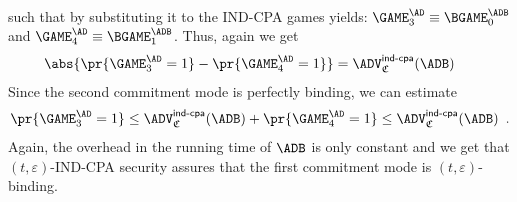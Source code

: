 \documentclass{crypto-exercise}
\newcommand{\ADVINDCPA}[2]{\ADV^{\mathsf{ind\text{-}cpa}}_{#1}{(#2)}}
\newcommand{\CS}{\mathfrak{C}}
\theoremstyle{plain}\newtheorem{stmt}{Statement}
\begin{document}
\begin{solution}
\begin{align*}
\end{align*}
such that by substituting it to the IND-CPA games yields: $\GAME_3^\AD\equiv\BGAME_0^\ADB$ and $\GAME_4^\AD\equiv\BGAME_1^\ADB$. Thus, again we get
\begin{align*}
\abs{\pr{\GAME_3^\AD=1}-\pr{\GAME_4^\AD=1}}&=\ADVINDCPA{\CS}{\ADB}\enspace
\end{align*}
Since the second commitment mode is perfectly binding, we can estimate
\begin{align*}
\pr{\GAME_3^\AD=1}\leq \ADVINDCPA{\CS}{\ADB}+\pr{\GAME_4^\AD=1}\leq \ADVINDCPA{\CS}{\ADB}\enspace.
\end{align*}
Again, the overhead in the running time of $\ADB$ is only constant and we get that $(t,\varepsilon)$-IND-CPA security assures that the first commitment mode is $(t,\varepsilon)$-binding.     
  
\end{solution}
\end{document}
